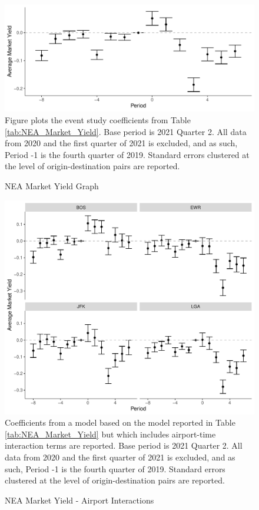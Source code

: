 \documentclass{article}
\begin{document}
\begin{appendices}
	\begin{figure}
		\caption{NEA Market Yield Graph}
		\label{fig:NEA_Market_Yield}
		\includegraphics[width = \linewidth]{NEA_Market_Yield_Graph.pdf}
		\footnotesize{Figure plots the event study coefficients from Table \ref{tab:NEA_Market_Yield}. Base period is 2021 Quarter 2. All data from 2020 and the first quarter of 2021 is excluded, and as such, Period -1 is the fourth quarter of 2019. Standard errors clustered at the level of origin-destination pairs are reported. }
	\end{figure}
	
	\begin{figure}
		\caption{NEA Market Yield - Airport Interactions}
		\label{fig:NEA_Market_Yield_Interaction}
		\includegraphics[width = \linewidth]{NEA_Airport_Yield_Graph}
		\footnotesize{Coefficients from a model based on the model reported in Table \ref{tab:NEA_Market_Yield} but which includes airport-time interaction terms are reported. Base period is 2021 Quarter 2. All data from 2020 and the first quarter of 2021 is excluded, and as such, Period -1 is the fourth quarter of 2019. Standard errors clustered at the level of origin-destination pairs are reported. }
	\end{figure}	


\end{appendices}
\end{document}

